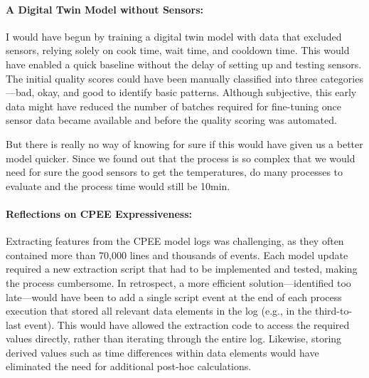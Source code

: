 \paragraph{A Digital Twin Model without Sensors:}
I would have begun by training a digital twin model with data that excluded sensors, relying solely on cook time, wait time, and cooldown time. This would have enabled a quick baseline without the delay of setting up and testing sensors. The initial quality scores could have been manually classified into three categories—bad, okay, and good to identify basic patterns. Although subjective, this early data might have reduced the number of batches required for fine-tuning once sensor data became available and before the quality scoring was automated. 

But there is really no way of knowing for sure if this would have given us a better model quicker. Since we found out that the process is so complex that we would need for sure the good sensors to get the temperatures, do many processes to evaluate and the process time would still be 10min.

\paragraph{Reflections on CPEE Expressiveness:}
Extracting features from the CPEE model logs was challenging, as they often contained more than 70,000 lines and thousands of events. Each model update required a new extraction script that had to be implemented and tested, making the process cumbersome. In retrospect, a more efficient solution—identified too late—would have been to add a single script event at the end of each process execution that stored all relevant data elements in the log (e.g., in the third-to-last event). This would have allowed the extraction code to access the required values directly, rather than iterating through the entire log. Likewise, storing derived values such as time differences within data elements would have eliminated the need for additional post-hoc calculations.
